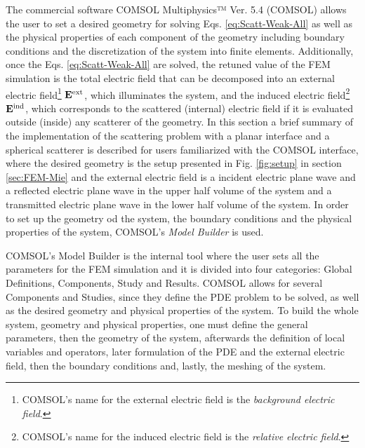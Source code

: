 
The commercial software COMSOL Multiphysics™ Ver. 5.4 (COMSOL) allows the user to set a desired geometry for solving Eqs. \eqref{eq:Scatt-Weak-All} as well as the physical properties of each component of the geometry including boundary conditions and the discretization of the system into finite elements.  Additionally, once the Eqs. \eqref{eq:Scatt-Weak-All} are solved, the retuned value of the FEM simulation is the total electric field that can be decomposed into an external electric field\footnote{COMSOL's name for the external electric field is the \textit{background electric field}.} $\vb{E}^\text{ext}$, which illuminates the system, and the induced electric field\footnote{COMSOL's name for the induced electric field is the \textit{relative electric field}.} $\vb{E}^\text{ind}$, which corresponds to the scattered (internal) electric field if it is evaluated outside (inside) any scatterer of the geometry. In this section a brief summary of the implementation of the scattering  problem with a planar interface and a spherical scatterer is described for users familiarized with the COMSOL interface, where the desired geometry is the setup presented in Fig. \ref{fig:setup} in section \ref{sec:FEM-Mie} and the external electric field is a incident electric plane wave and a reflected electric plane wave in the upper half volume of the system and a transmitted electric plane wave in the lower half volume of the system. In order to set up the geometry od the system, the boundary conditions and the physical properties of the system, COMSOL's  \textit{Model Builder}  is used.

COMSOL's Model Builder is the internal tool where the user sets all the parameters for the FEM simulation and it is divided into four categories:  Global Definitions, Components, Study and Results. COMSOL allows for several Components and Studies, since they define the PDE problem to be solved, as well as the desired geometry and  physical properties of the system. To build the whole system, geometry and physical properties, one must define the general parameters, then the geometry of the system, afterwards the definition of local variables and operators, later formulation of the PDE and the external electric field,  then the boundary conditions and, lastly, the meshing of the system.

